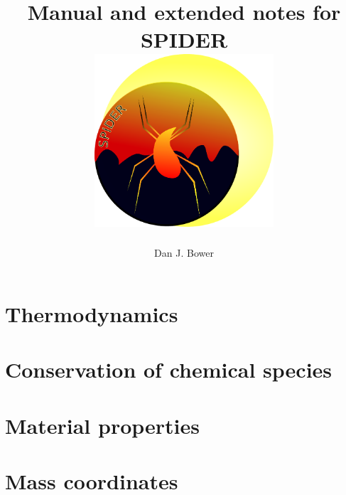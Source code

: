 \documentclass[12pt,notitlepage]{article}
\begin{document}
\title{Manual and extended notes for SPIDER\\[2ex] \includegraphics[width=0.5\textwidth]{figs/spider_logo}}
\author{Dan J. Bower}


\maketitle

\tableofcontents
\newpage
\listoffigures
\newpage
\listoftables
\newpage
{}


%

\section{Thermodynamics}


\section{Conservation of chemical species}


\section{Material properties}


\section{Mass coordinates}

\end{document}
